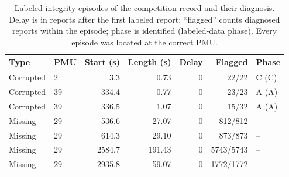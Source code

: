 \begin{table}[t]\centering\small
\caption{Labeled integrity episodes of the competition record and their diagnosis. Delay is in reports after the first labeled report; ``flagged'' counts diagnosed reports within the episode; phase is identified (labeled-data phase). Every episode was located at the correct PMU.}
\label{tab:integrity-raw}
\footnotesize\setlength{\tabcolsep}{3.5pt}\begin{tabular}{@{}llrrrrl@{}}\toprule
Type & PMU & Start (s) & Length (s) & Delay & Flagged & Phase\\\midrule
Corrupted & 2 & 3.3 & 0.73 & 0 & 22/22 & C (C)\\
Corrupted & 39 & 334.4 & 0.77 & 0 & 23/23 & A (A)\\
Corrupted & 39 & 336.5 & 1.07 & 0 & 15/32 & A (A)\\
Missing & 29 & 536.6 & 27.07 & 0 & 812/812 & --\\
Missing & 29 & 614.3 & 29.10 & 0 & 873/873 & --\\
Missing & 29 & 2584.7 & 191.43 & 0 & 5743/5743 & --\\
Missing & 29 & 2935.8 & 59.07 & 0 & 1772/1772 & --\\
\bottomrule\end{tabular}\end{table}
